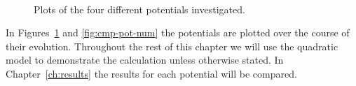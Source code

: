 \begin{figure}[htbp]
\centering%
\qquad%
\\%
\qquad%
\caption[The Four Potentials]{Plots of the four different potentials investigated.}
\label{fig:potentials-num}
\end{figure}
% 
% 
In Figures~\ref{fig:potentials-num} and \ref{fig:cmp-pot-num} the potentials are
plotted over the course of their evolution. Throughout the rest of this
chapter we will use the quadratic model to
demonstrate the calculation unless otherwise stated. In Chapter~\ref{ch:results} the
results for each potential will be compared.




